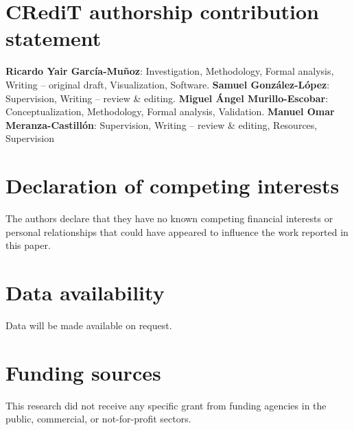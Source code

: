 \documentclass[preprint, 12pt, sort&compress]{elsarticle}
\begin{document}
\section*{CRediT authorship contribution statement}
\textbf{Ricardo Yair García-Muñoz}: Investigation, Methodology, Formal analysis, Writing – original draft, Visualization, Software. \textbf{Samuel González-López}: Supervision, Writing – review \& editing. \textbf{Miguel Ángel Murillo-Escobar}: Conceptualization,
Methodology, Formal analysis, Validation. \textbf{Manuel Omar Meranza-Castillón}: Supervision, Writing – review \& editing, Resources, Supervision

\section*{Declaration of competing interests} 
The authors declare that they have no known competing financial
interests or personal relationships that could have appeared to
influence the work reported in this paper.

\section*{Data availability}
Data will be made available on request.

\section*{Funding sources}
This research did not receive any specific grant from funding agencies in the public, commercial, or not-for-profit sectors.





\end{document}
